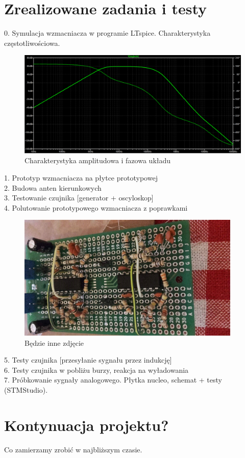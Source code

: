 \documentclass[12pt]{article}
\begin{document}
\section{Zrealizowane zadania i testy}
0. Symulacja wzmacniacza w programie LTspice. Charakterystyka częstotliwościowa.\\
\begin{figure}[H]
\begin{center}
\includegraphics[width=1\textwidth]{figures/ampl_faz.png}
\caption{Charakterystyka amplitudowa i fazowa układu}
\end{center}
\end{figure}
1. Prototyp wzmacniacza na płytce prototypowej\\
2. Budowa anten kierunkowych\\
3. Testowanie czujnika [generator + oscyloskop]\\
4. Polutowanie prototypowego wzmacniacza z poprawkami\\
\begin{figure}[H]
\begin{center}
\includegraphics[width=0.95\textwidth]{figures/plytka.png}
\caption{Będzie inne zdjęcie}
\end{center}
\end{figure}
5. Testy czujnika [przesyłanie sygnału przez indukcję]\\
6. Testy czujnika w pobliżu burzy, reakcja na wyładowania\\
7. Próbkowanie sygnały analogowego. Płytka nucleo, schemat + testy (STMStudio).\\


\section{Kontynuacja projektu?}
Co zamierzamy zrobić w najbliższym czasie.
\end{document}
